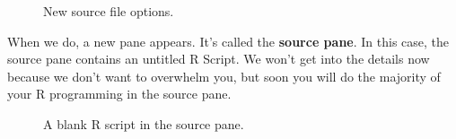 \documentclass[
  letterpaper,
  DIV=11,
  numbers=noendperiod]{scrreprt}
\begin{document}
\begin{figure}


\caption{\label{fig-source2}New source file options.}

\end{figure}%

When we do, a new pane appears. It's called the \textbf{source pane}. In
this case, the source pane contains an untitled R Script. We won't get
into the details now because we don't want to overwhelm you, but soon
you will do the majority of your R programming in the source pane.

\begin{figure}


\caption{\label{fig-source3}A blank R script in the source pane.}

\end{figure}%
\end{document}
